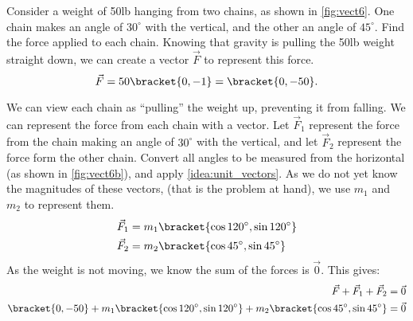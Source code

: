 \begin{example}\label{ex_vect6}
Consider a weight of 50lb hanging from two chains, as shown in \autoref{fig:vect6}. One chain makes an angle of $30^\circ$ with the vertical, and the other an angle of $45^\circ$. Find the force applied to each chain.
\solution
Knowing that gravity is pulling the 50lb weight straight down, we can create a vector $\vec F$ to represent this force. 
\[\vec F = 50\bracket{0,-1}=\bracket{0,-50}.\]

We can view each chain as ``pulling'' the weight up, preventing it from falling. We can represent the force from each chain with a vector. Let $\vec F_1$ represent the force from the chain making an angle of $30^\circ$ with the vertical, and let $\vec F_2$ represent the force form the other chain. Convert all angles to be measured from the horizontal (as shown in \autoref{fig:vect6b}), and apply \autoref{idea:unit_vectors}. As we do not yet know the magnitudes of these vectors, (that is the problem at hand), we use $m_1$ and $m_2$ to represent them.
\begin{align*}
\vec F_1 &= m_1\bracket{\cos 120^\circ,\sin120^\circ} \\
\vec F_2 &= m_2\bracket{\cos 45^\circ,\sin45^\circ}
\end{align*}
As the weight is not moving, we know the sum of the forces is $\vec 0$. This gives:
\begin{align*}
\vec F + \vec F_1 + \vec F_2 & = \vec 0\\
\bracket{0,-50}+ m_1\bracket{\cos 120^\circ,\sin120^\circ}+ m_2\bracket{\cos 45^\circ,\sin45^\circ}&=\vec 0
\end{align*}



\end{example}
